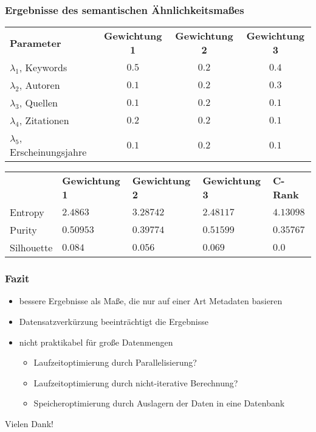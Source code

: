 \documentclass[12pt, xcolor=table]{beamer}
\begin{document}
\begin{frame}
    \frametitle{Ergebnisse des semantischen Ähnlichkeitsmaßes}
    \scriptsize{
    \begin{table}[H]
    \centering
    \begin{tabular}{l c c c}
		\textbf{Parameter} &\textbf{Gewichtung 1} &\textbf{Gewichtung 2} &\textbf{Gewichtung 3} \\
		$\lambda_1$, Keywords & $0.5$ & $0.2$ & $0.4$\\
		$\lambda_2$, Autoren & $0.1$ & $0.2$ & $0.3$\\
		$\lambda_3$, Quellen & $0.1$ & $0.2$ & $0.1$\\
		$\lambda_4$, Zitationen & $0.2$ & $0.2$ & $0.1$\\
		$\lambda_5$, Erscheinungsjahre & $0.1$ & $0.2$ & $0.1$\\
    \end{tabular}
    \end{table}
    }
    \scriptsize{
    \begin{table}[H]
    \centering
    \begin{tabular}{l l l l l}
		     &\textbf{Gewichtung 1} &\textbf{Gewichtung 2} &\textbf{Gewichtung 3} & \textbf{C-Rank} \\
	    	Entropy & $2.4863$ & $3.28742$ & $2.48117$ & $4.13098$\\
		    Purity & $0.50953$ & $0.39774$ & $0.51599$ & $0.35767$\\
    		Silhouette & $0.084$ & $0.056$ & $0.069$ & $0.0$ \\
    \end{tabular}
\end{table}
}
\end{frame}

\begin{frame}
    \frametitle{Fazit}
    \begin{itemize}
    \item bessere Ergebnisse als Maße, die nur auf einer Art Metadaten basieren
    \item Datensatzverkürzung beeinträchtigt die Ergebnisse
    \item nicht praktikabel für große Datenmengen
        \begin{itemize}
            \item Laufzeitoptimierung durch Parallelisierung?
            \item Laufzeitoptimierung durch nicht-iterative Berechnung?
            \item Speicheroptimierung durch Auslagern der Daten in eine Datenbank
        \end{itemize}
    \end{itemize}
\end{frame}

\begin{frame}
\centerline{Vielen Dank!}
\end{frame}
\end{document}
